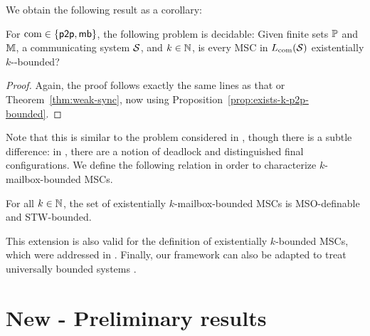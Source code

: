 \documentclass{article}
\begin{document}
We obtain the following result as a corollary:

\begin{theorem}\label{thm:exists-sync}
For $\textup{com} \in \{\mathsf{p2p}, \mathsf{mb}\}$, the following problem is decidable:
Given finite sets $\mathbb{P}$ and $\mathbb{M}$, a communicating system $\mathcal{S}$, and $k \in \mathbb{N}$,
is every MSC in $L_{\textup{com}}(\mathcal{S})$ existentially $k$-\pp-bounded?
\end{theorem}

\begin{proof}
Again, the proof follows exactly the same lines as that or Theorem~\ref{thm:weak-sync},
now using Proposition~\ref{prop:exists-k-p2p-bounded}.
\end{proof}

Note that this is similar to the problem considered
in \cite{GKM07,kuske2014communicating},
though there is a subtle difference: in \cite{GKM07,kuske2014communicating},
there are a notion of deadlock and distinguished final configurations.
We define the following relation in order to characterize $k$-mailbox-bounded MSCs.


\begin{proposition}\label{prop:exist-k-mailbox-bounded}
	For all $k \in \mathbb{N}$, the set of existentially $k$-mailbox-bounded MSCs
	is MSO-definable and STW-bounded.
\end{proposition}



This extension is also valid for the \pp definition of existentially $k$-bounded MSCs, which
were addressed in \cite{GKM07}. Finally, our framework can also be adapted to treat universally bounded systems \cite{HENRIKSEN20051,DBLP:conf/fossacs/LohreyM02}.


\section{New - Preliminary results}


\end{document}

